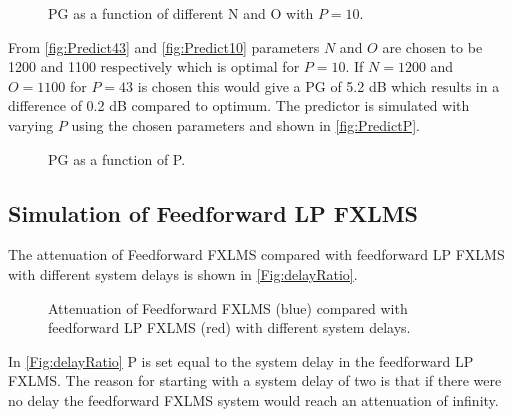 \begin{figure}[H]
	\centering
	
	\caption{PG as a function of different N and O with $P=10$.}
	\label{fig:Predict10}
\end{figure}

From \autoref{fig:Predict43} and \autoref{fig:Predict10} parameters $N$ and $O$ are chosen to be 1200 and 1100 respectively which is optimal for $P=10$. If $N=1200$ and $O=1100$ for $P=43$ is chosen this would give a PG of 5.2 dB which results in a difference of 0.2 dB compared to optimum.
The predictor is simulated with varying $P$ using the chosen parameters and shown in \autoref{fig:PredictP}.

\begin{figure}[H]
	\centering
	
	\caption{PG as a function of P.}
	\label{fig:PredictP}
\end{figure}



\subsection{Simulation of Feedforward LP FXLMS}
The attenuation of Feedforward FXLMS compared with feedforward LP FXLMS with different system delays is shown in \autoref{Fig:delayRatio}.
\begin{figure}[H]
	\centering
	
	\caption{Attenuation of Feedforward FXLMS (blue) compared with feedforward LP FXLMS (red) with different system delays.}
	\label{Fig:delayRatio}
\end{figure}
In \autoref{Fig:delayRatio} P is set equal to the system delay in the feedforward LP FXLMS. The reason for starting with a system delay of two is that if there were no delay the feedforward FXLMS system would reach an attenuation of infinity.  








